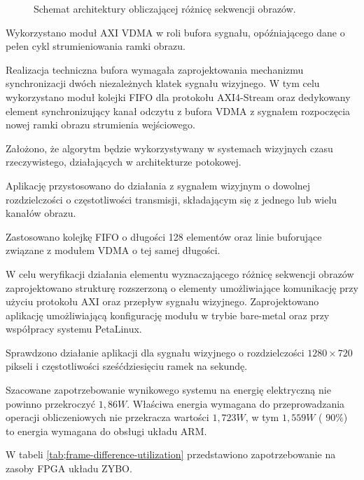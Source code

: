 \begin{figure}[h]
	\centering
	\def\svgwidth{\textwidth}
	
	\caption{Schemat architektury obliczającej różnicę sekwencji obrazów.}
	\label{fig:frame-difference}
\end{figure}

Wykorzystano moduł AXI VDMA w roli bufora sygnału, opóźniającego dane o pełen cykl strumieniowania ramki obrazu.

Realizacja techniczna bufora wymagała zaprojektowania mechanizmu synchronizacji dwóch niezależnych klatek sygnału wizyjnego. W tym celu wykorzystano moduł kolejki FIFO dla protokołu AXI4-Stream oraz dedykowany element synchronizujący kanał odczytu z bufora VDMA z sygnałem rozpoczęcia nowej ramki obrazu strumienia wejściowego.

Założono, że algorytm będzie wykorzystywany w systemach wizyjnych czasu rzeczywistego, działających w architekturze potokowej. 

Aplikację przystosowano do działania z sygnałem wizyjnym o dowolnej rozdzielczości o częstotliwości transmisji, składającym się z jednego lub wielu kanałów obrazu.

Zastosowano kolejkę FIFO o długości 128 elementów oraz linie buforujące związane z modułem VDMA o tej samej długości.

W celu weryfikacji działania elementu wyznaczającego różnicę sekwencji obrazów zaprojektowano strukturę rozszerzoną o elementy umożliwiające komunikację przy użyciu protokołu AXI oraz przepływ sygnału wizyjnego. Zaprojektowano aplikację umożliwiającą konfigurację modułu w trybie bare-metal oraz przy współpracy systemu PetaLinux.

Sprawdzono działanie aplikacji dla sygnału wizyjnego o rozdzielczości $1280 \times 720$ pikseli i częstotliwości sześćdziesięciu ramek na sekundę.

Szacowane zapotrzebowanie wynikowego systemu na energię elektryczną nie powinno przekroczyć $1,86W$. Właściwa energia wymagana do przeprowadzania operacji obliczeniowych nie przekracza wartości $1,723W$, w tym $1,559W$ ( $90\%$) to energia wymagana do obsługi układu ARM.

W tabeli \ref{tab;frame-difference-utilization} przedstawiono zapotrzebowanie na zasoby FPGA układu ZYBO.

